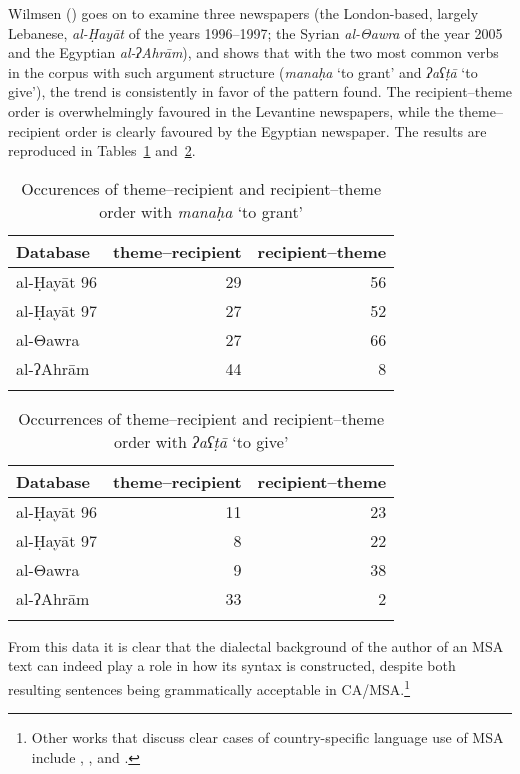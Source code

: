 \documentclass[output=paper]{langsci/langscibook}
\begin{document}
Wilmsen (\citeyear[114--115]{Wilmsen2010}) goes on to examine three newspapers (the London-based, largely Lebanese, \textit{al-Ḥayāt} of the years 1996--1997; the Syrian \textit{al-Θawra} of the year 2005 and the Egyptian \textit{al-ʔAhrām}), and shows that with the two most common verbs in the corpus with such argument structure (\textit{manaḥa} ‘to grant’ and \textit{ʔaʕṭā} ‘to give’), the trend is consistently in favor of the pattern found. The recipient–theme order is overwhelmingly favoured in the Levantine newspapers, while the theme–recipient order is clearly favoured by the Egyptian newspaper. The results are reproduced in Tables~\ref{tab:vanputten:1} and~\ref{tab:vanputten:2}.


\begin{table}
\begin{tabular}{lrr}
\lsptoprule
{Database} & {theme–recipient} & {recipient–theme}\\\midrule
al-Ḥayāt 96 & 29 & 56\\
al-Ḥayāt 97 & 27 & 52\\
al-Θawra & 27 & 66\\
al-ʔAhrām & 44 & \hphantom{1}8\\
\lspbottomrule
\end{tabular}
\caption{\label{bkm:Ref533762442}\label{tab:vanputten:1}Occurences of theme–recipient and recipient–theme order with \textit{manaḥa} ‘to grant’}
\end{table}

\begin{table}
\begin{tabular}{lrr}
\lsptoprule
{Database} & {theme–recipient} & {recipient–theme}\\\midrule
al-Ḥayāt 96 & 11 & 23\\
al-Ḥayāt 97 & \hphantom{1}8 & 22\\
al-Θawra    &  \hphantom{1}9 & 38\\
al-ʔAhrām   & 33 &  \hphantom{1}2\\
\lspbottomrule
\end{tabular}
\caption{\label{bkm:Ref533762457}\label{tab:vanputten:2}Occurrences of theme–recipient and recipient–theme order with \textit{ʔaʕṭā} ‘to give’}
\end{table}

From this data it is clear that the dialectal background of the author of an MSA text can indeed play a role in how its syntax is constructed, despite both resulting sentences being grammatically acceptable in CA/MSA.\footnote{Other works that discuss clear cases of country-specific language use of MSA include \citet{Ibrahim2009}, \citet{Parkinson2003},  \citet{Parkinson2007} and \citet{ParkinsonIbrahim1999}.}
\end{document}
